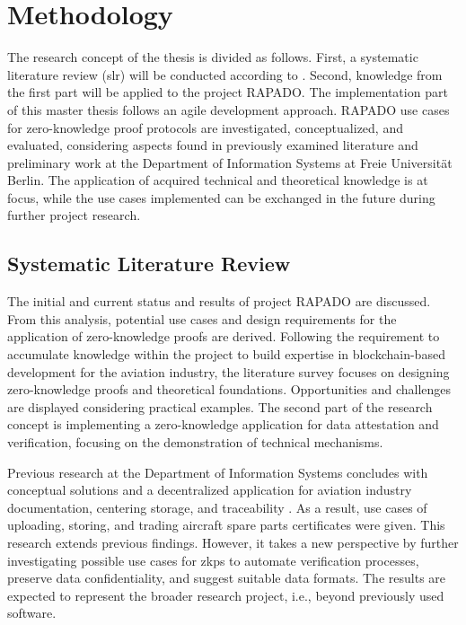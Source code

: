\chapter{Methodology}
The research concept of the thesis is divided as follows. First, a systematic literature review (\acrshort{slr}) will be conducted according to \cite{vomBrockeJan2019TDgs, Webster2002AnalyzingTP}. Second, knowledge from the first part will be applied to the project RAPADO. The implementation part of this master thesis follows an agile development approach. RAPADO use cases for zero-knowledge proof protocols are investigated, conceptualized, and evaluated, considering aspects found in previously examined literature and preliminary work at the Department of Information Systems at Freie Universit{\"a}t Berlin. The application of acquired technical and theoretical knowledge is at focus, while the use cases implemented can be exchanged in the future during further project research. 

\section{Systematic Literature Review}
The initial and current status and results of project RAPADO are discussed. From this analysis, potential use cases and design requirements for the application of zero-knowledge proofs are derived. Following the requirement to accumulate knowledge within the project to build expertise in blockchain-based development for the aviation industry, the literature survey focuses on designing zero-knowledge proofs and theoretical foundations. Opportunities and challenges are displayed considering practical examples. The second part of the research concept is implementing a zero-knowledge application for  data attestation and verification, focusing on the demonstration of technical mechanisms.

Previous research at the Department of Information Systems concludes with conceptual solutions and a decentralized application for aviation industry  documentation, centering storage, and traceability \citep{ZedelJ}. As a result, use cases of uploading, storing, and trading aircraft spare parts certificates were given. This research extends previous findings. However, it takes a new perspective by further investigating possible use cases for \acrshort{zkp}s to automate verification processes, preserve data confidentiality, and suggest suitable data formats. The results are expected to represent the broader research project, i.e., beyond previously used software.

